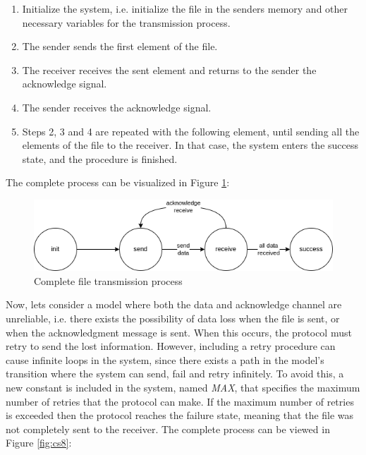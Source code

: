 \begin{enumerate}
    \item Initialize the system, i.e. initialize the file in the senders memory and other necessary variables for the transmission process.
    \item The sender sends the first element of the file.
    \item The receiver receives the sent element and returns to the sender the acknowledge signal.
    \item The sender receives the acknowledge signal.
    \item Steps 2, 3 and 4 are repeated with the following element, until sending all the elements of the file to the receiver. In that case, the system enters the success state, and the procedure is finished.
\end{enumerate}
The complete process can be visualized in Figure \ref{fig:cs7}:
\begin{figure}[H]
    \centering
    \includegraphics[scale = 0.7]{images/CS7.png}
    \caption{Complete file transmission process}
    \label{fig:cs7}
\end{figure}
Now, lets consider a model where both the data and acknowledge channel are unreliable, i.e. there exists the possibility of data loss when the file is sent, or when the acknowledgment message is sent. When this occurs, the protocol must retry to send the lost information. However, including a retry procedure can cause infinite loops in the system, since there exists a path in the model's transition where the system can send, fail and retry infinitely. To avoid this, a new constant is included in the system, named \textit{MAX}, that specifies the maximum number of retries that the protocol can make. If the maximum number of retries is exceeded then the protocol reaches the failure state, meaning that the file was not completely sent to the receiver. The complete process can be viewed in Figure \ref{fig:cs8}:     

